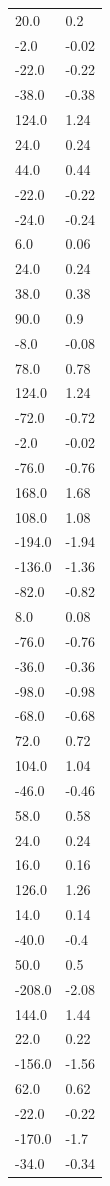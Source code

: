 \begin{longtable}{ll}
20.0 & 0.2 \\
-2.0 & -0.02 \\
-22.0 & -0.22 \\
-38.0 & -0.38 \\
124.0 & 1.24 \\
24.0 & 0.24 \\
44.0 & 0.44 \\
-22.0 & -0.22 \\
-24.0 & -0.24 \\
6.0 & 0.06 \\
24.0 & 0.24 \\
38.0 & 0.38 \\
90.0 & 0.9 \\
-8.0 & -0.08 \\
78.0 & 0.78 \\
124.0 & 1.24 \\
-72.0 & -0.72 \\
-2.0 & -0.02 \\
-76.0 & -0.76 \\
168.0 & 1.68 \\
108.0 & 1.08 \\
-194.0 & -1.94 \\
-136.0 & -1.36 \\
-82.0 & -0.82 \\
8.0 & 0.08 \\
-76.0 & -0.76 \\
-36.0 & -0.36 \\
-98.0 & -0.98 \\
-68.0 & -0.68 \\
72.0 & 0.72 \\
104.0 & 1.04 \\
-46.0 & -0.46 \\
58.0 & 0.58 \\
24.0 & 0.24 \\
16.0 & 0.16 \\
126.0 & 1.26 \\
14.0 & 0.14 \\
-40.0 & -0.4 \\
50.0 & 0.5 \\
-208.0 & -2.08 \\
144.0 & 1.44 \\
22.0 & 0.22 \\
-156.0 & -1.56 \\
62.0 & 0.62 \\
-22.0 & -0.22 \\
-170.0 & -1.7 \\
-34.0 & -0.34 \\

\end{longtable}
